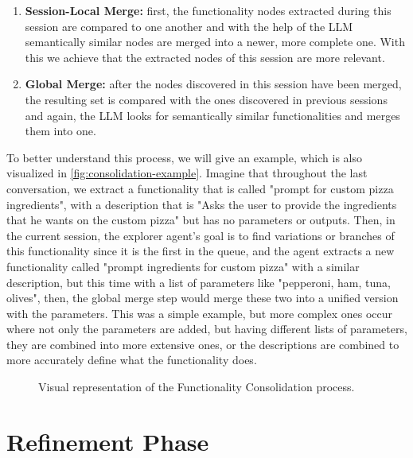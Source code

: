 \begin{enumerate}
  \item \textbf{Session-Local Merge:}
    first, the functionality nodes extracted during this session
    are compared to one another and with the help of the \ac{LLM}
    semantically similar nodes are merged into a newer, more complete one.
    With this we achieve that the extracted nodes of this session are more relevant.

  \item \textbf{Global Merge:}
    after the nodes discovered in this session have been merged,
    the resulting set is compared with the ones discovered in previous sessions
    and again, the \ac{LLM} looks for semantically similar functionalities
    and merges them into one.
\end{enumerate}

To better understand this process, we will give an example,
which is also visualized in \autoref{fig:consolidation-example}.
Imagine that throughout the last conversation,
we extract a functionality that is called
"prompt for custom pizza ingredients",
with a description that is
"Asks the user to provide the ingredients that he wants on the custom pizza"
but has no parameters or outputs.
Then, in the current session,
the explorer agent's goal is
to find variations or branches of this functionality
since it is the first in the queue,
and the agent extracts a new functionality called
"prompt ingredients for custom pizza"
with a similar description,
but this time with a list of parameters like
"pepperoni, ham, tuna, olives",
then, the global merge step would merge these two
into a unified version with the parameters.
This was a simple example,
but more complex ones occur where
not only the parameters are added,
but having different lists of parameters,
they are combined into more extensive ones,
or the descriptions are combined
to more accurately define what the functionality does.

\begin{figure}[htpb]
    \centering
    
    \caption{Visual representation of the Functionality Consolidation process.}
    \label{fig:consolidation-example}
\end{figure}

\section{Refinement Phase}\label{sec:refinement}



